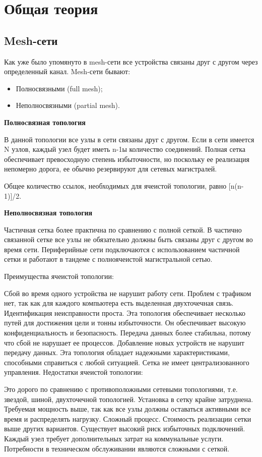 \documentclass[a4paper]{article}
\begin{document}
\section{Общая теория}

\subsection{Mesh-сети}
Как уже было упомянуто в mesh-сети все устройства связаны друг с другом через определенный канал.
Mesh-сети бывают: 
\begin{itemize}
    \item Полносвязными (full mesh);
    \item Неполносвязными (partial mesh).
\end{itemize}

\textbf{Полноcвязная топология} \par

В данной топологии все узлы в сети связаны друг с другом. Если в сети имеется N узлов, каждый узел будет иметь n-1ы количество соединений. Полная сетка обеспечивает превосходную степень избыточности, но поскольку ее реализация непомерно дорога, ее обычно резервируют для сетевых магистралей.

Общее количество ссылок, необходимых для ячеистой топологии, равно [n(n-1)]/2.

\textbf{Неполносвязная топология}

Частичная сетка более практична по сравнению с полной сеткой. В частично связанной сетке все узлы не обязательно должны быть связаны друг с другом во время сети. Периферийные сети подключаются с использованием частичной сетки и работают в тандеме с полноячеистой магистральной сетью.

Преимущества ячеистой топологии:

Сбой во время одного устройства не нарушит работу сети.
Проблем с трафиком нет, так как для каждого компьютера есть выделенная двухточечная связь.
Идентификация неисправности проста.
Эта топология обеспечивает несколько путей для достижения цели и тонны избыточности.
Он обеспечивает высокую конфиденциальность и безопасность.
Передача данных более стабильна, потому что сбой не нарушает ее процессов.
Добавление новых устройств не нарушит передачу данных.
Эта топология обладает надежными характеристиками, способными справиться с любой ситуацией.
Сетка не имеет централизованного управления.
Недостатки ячеистой топологии:

Это дорого по сравнению с противоположными сетевыми топологиями, т.е. звездой, шиной, двухточечной топологией.
Установка в сетку крайне затруднена.
Требуемая мощность выше, так как все узлы должны оставаться активными все время и распределять нагрузку.
Сложный процесс.
Стоимость реализации сетки выше других вариантов.
Существует высокий риск избыточных подключений.
Каждый узел требует дополнительных затрат на коммунальные услуги.
Потребности в техническом обслуживании являются сложными с сеткой.
\end{document}
